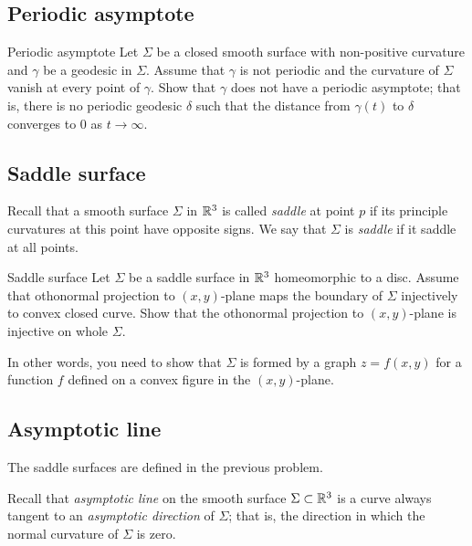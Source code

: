 \subsection*{Periodic asymptote}

\begin{pr}{}{Periodic asymptote}\label{Asymptotic geodesic}
Let $\Sigma$ be a closed smooth surface with non-positive curvature
and $\gamma$ be a geodesic in $\Sigma$.
Assume that $\gamma$ is not periodic
and the curvature of $\Sigma$ vanish at every point of $\gamma$.
Show that $\gamma$ does not have a periodic asymptote;
that is, there is no periodic geodesic $\delta$ such that the distance from $\gamma(t)$ to $\delta$  converges to $0$ as $t\to\infty$. 
\end{pr}

\subsection*{Saddle surface}
\label{Saddle surface}

Recall that a smooth surface $\Sigma$ in $\mathbb{R}^3$
is called \emph{saddle} at point $p$ if its principle curvatures at this point have opposite signs. 
We say that $\Sigma$ is \emph{saddle} if it saddle at all points.

\begin{pr}{}{Saddle surface}
Let $\Sigma$ be a saddle surface in $\mathbb{R}^3$
homeomorphic to a disc.
Assume that othonormal projection to $(x,y)$-plane
maps the boundary of $\Sigma$
injectively to convex closed curve.
Show that the othonormal projection to $(x,y)$-plane is injective on whole $\Sigma$.
\end{pr}

In other words, you need to show that $\Sigma$ is formed by a graph $z=f(x,y)$ for a function $f$ defined on a convex figure in the $(x,y)$-plane.



\subsection*{Asymptotic line}

The saddle surfaces are defined in the previous problem.

Recall that \emph{asymptotic line} on the smooth surface $\Sigma\subset \mathbb{R}^3$
is a curve always tangent to an \emph{asymptotic direction} of $\Sigma$; 
that is, the direction in which the normal curvature of $\Sigma$ is zero.

